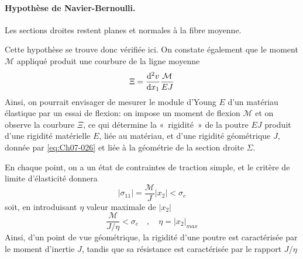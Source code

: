 \paragraph{Hypothèse de Navier-Bernoulli.} Les sections droites restent planes et normales à la fibre moyenne.

Cette hypothèse se trouve donc vérifiée ici.
On constate également que le moment $\mathcal{M}$ appliqué produit une courbure de la ligne moyenne
\begin{equation}
    \Xi = \frac{\mathrm{d}^2 v}{\mathrm{d} x_1} \frac{\mathcal{M}}{EJ}
    \label{eq:Ch07-034}
\end{equation}
Ainsi, on pourrait envisager de mesurer le module d'Young $E$ d'un matériau élastique par un essai de flexion: on impose un moment de flexion $\mathcal{M}$ et on observe la courbure $\Xi$, ce qui détermine la «~rigidité~» de la poutre $EJ$ produit d'une rigidité matérielle $E$, liée au matériau, et d'une rigidité géométrique $J$, donnée par \eqref{eq:Ch07-026} et liée à la géométrie de la section droite $\Sigma$.

En chaque point, on a un état de contraintes de traction simple, et le critère de limite d'élasticité donnera 
\begin{equation}
    \left|\sigma_{11}\right| = \frac{\mathcal{M}}{J} \left|x_2\right| < \sigma_e
    \label{eq:Ch07-035}
\end{equation}
soit, en introduisant $\eta$ valeur maximale de $\left|x_2\right|$
\begin{equation}
    \frac{\mathcal{M}}{J/\eta} < \sigma_e \quad , \quad \eta = \left|x_2\right|_{max}
    \label{eq:Ch07-036}
\end{equation}
Ainsi, d'un point de vue géométrique, la rigidité d'une poutre est caractérisée  par le moment  d'inertie $J$,  tandis que sa résistance est caractérisée par le rapport $J/\eta$

